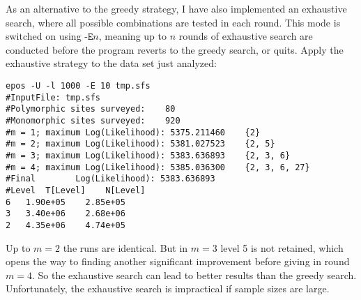 \documentclass[a4paper]{article}
\newcommand{\ty}{\texttt}
\begin{document}
\begin{itemize}
As an alternative to the greedy strategy, I have also implemented an
exhaustive search, where all possible combinations are tested in each
round. This mode is switched on using $\ty{-E} n$, meaning up to $n$
rounds of exhaustive search are conducted before the program reverts
to the greedy search, or quits. Apply the exhaustive strategy to the
data set just analyzed:
\begin{verbatim}
epos -U -l 1000 -E 10 tmp.sfs
#InputFile:	tmp.sfs
#Polymorphic sites surveyed:	80
#Monomorphic sites surveyed:	920
#m = 1; maximum Log(Likelihood): 5375.211460	{2}
#m = 2; maximum Log(Likelihood): 5381.027523	{2, 5}
#m = 3; maximum Log(Likelihood): 5383.636893	{2, 3, 6}
#m = 4; maximum Log(Likelihood): 5385.036300	{2, 3, 6, 27}
#Final        Log(Likelihood): 5383.636893
#Level	T[Level]	N[Level]
6	1.90e+05	2.85e+05
3	3.40e+06	2.68e+06
2	4.35e+06	4.74e+05
\end{verbatim}
Up to $m=2$ the runs are identical. But in $m=3$ level 5 is not
retained, which opens the way to finding another significant
improvement before giving in round $m=4$. So the exhaustive search can
lead to better results than the greedy search. Unfortunately, the
exhaustive search is impractical if sample sizes are large.



\end{itemize}
\end{document}
